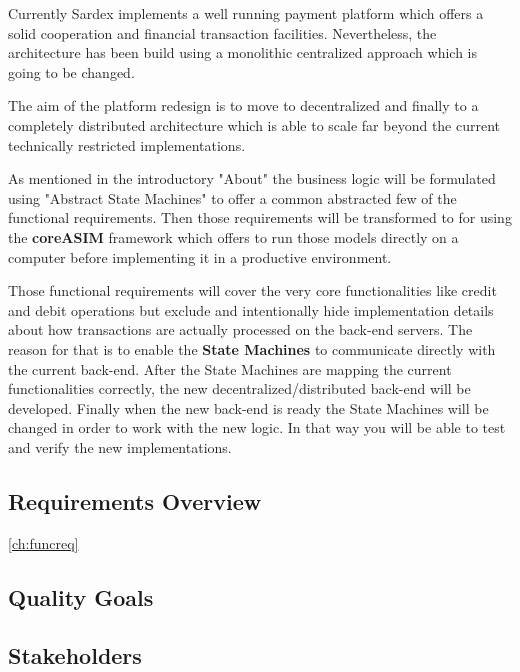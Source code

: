 Currently Sardex implements a well running payment platform which offers a solid cooperation and financial transaction facilities. Nevertheless, the architecture has been build using a monolithic centralized approach which is going to be changed.

The aim of the platform redesign is to move to decentralized and finally to a completely distributed architecture which is able to scale far beyond the current technically restricted implementations.

As mentioned in the introductory "About" the business logic will be formulated using "Abstract State Machines" to offer a common abstracted few of the functional requirements. Then those requirements will be transformed to for using the \textbf{coreASIM} framework which offers to run those models directly on a computer before implementing it in a productive environment.

Those functional requirements will cover the very core functionalities like credit and debit operations but exclude and intentionally hide implementation details about how transactions are actually processed on the back-end servers. The reason for that is to enable the \textbf{State Machines} to communicate directly with the current back-end. After the State Machines are mapping the current functionalities correctly, the new decentralized/distributed back-end will be developed. Finally when the new back-end is ready the State Machines will be changed in order to work with the new logic. In that way you will be able to test and verify the new implementations.

\subsection{Requirements Overview}\label{_requirements_overview}

\ref{ch:funcreq}

\subsection{Quality Goals}\label{_quality_goals}

\subsection{Stakeholders}\label{_stakeholders}

